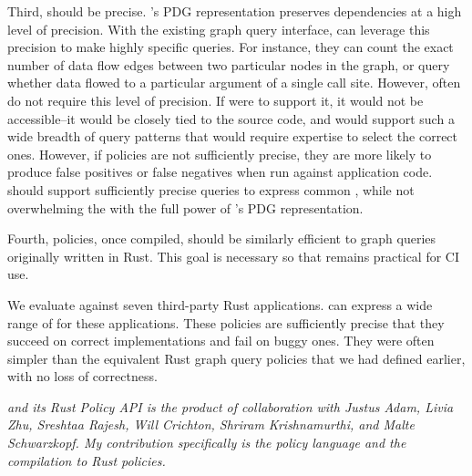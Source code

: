 Third, \syslang{} should be precise.
%
\sys{}'s PDG representation preserves dependencies at a high level of precision.
%
%
With the existing graph query interface, \writers{} can leverage this precision to make highly specific queries.
%
For instance, they can count the exact number of data flow edges between two particular nodes in the graph,
or query whether data flowed to a particular argument of a single call site.
%
However, \policies{} often do not require this level of precision.
%
If \syslang{} were to support it, it would not be accessible--it would be closely tied to the source code,
and would support such a wide breadth of query patterns that \writers{} would require expertise to select the correct ones.
%
However, if policies are not sufficiently precise, they are more likely to produce false positives or false negatives when run against application code.
%
%
%
\syslang{} should support sufficiently precise queries to express common \policies{}, 
while not overwhelming the \writer{} with the full power of \sys{}'s PDG representation. 

Fourth, \syslang{} policies, once compiled, should be similarly efficient to graph queries originally written in Rust.
%
This goal is necessary so that \sys{} remains practical for CI use.

We evaluate \syslang{} against seven third-party Rust applications.
%
%
\syslang{} can express a wide range of \policies{} for these applications.
%
These policies are sufficiently precise that they succeed on correct implementations and fail on buggy ones. 
%
They were often simpler than the equivalent Rust graph query policies that we had defined earlier, with no loss of correctness.


\emph{\sys{} and its Rust Policy API is the product of collaboration with Justus Adam, Livia Zhu, Sreshtaa Rajesh, 
Will Crichton, Shriram Krishnamurthi, and Malte Schwarzkopf.
My contribution specifically is the \syslang{} policy language and the compilation to Rust policies.}
